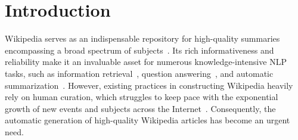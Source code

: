 \documentclass[11pt]{article}
\begin{document}
\section{Introduction}

Wikipedia serves as an indispensable repository for high-quality summaries encompassing a broad spectrum of subjects~\citep{lemmerich2019world}. Its rich informativeness and reliability make it an invaluable asset for numerous knowledge-intensive NLP tasks, such as information retrieval~\citep{lehmann2015dbpedia,sharma2024exploring}, question answering~\citep{chen2017reading,yang2018hotpotqa}, and automatic summarization~\citep{liu2018generating}.  However, existing practices in constructing Wikipedia heavily rely on human curation, which struggles to keep pace with the exponential growth of new events and subjects across the Internet~\citep{2019t5,biderman2022datasheet}. Consequently, the automatic generation of high-quality Wikipedia articles has become an urgent need.

\end{document}
